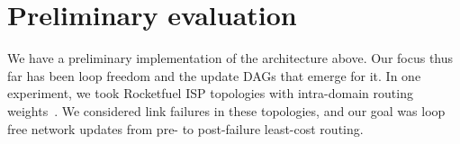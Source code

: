 


\section{Preliminary evaluation}
\label{sec:eval}

We have a preliminary implementation of the architecture above. Our focus thus far has been loop freedom and the update DAGs that emerge for it. In one experiment, we took Rocketfuel ISP topologies with intra-domain routing weights~\cite{rocketfuel-weights}. We considered link failures in these topologies, and our goal was loop free network updates from pre- to post-failure least-cost routing.

